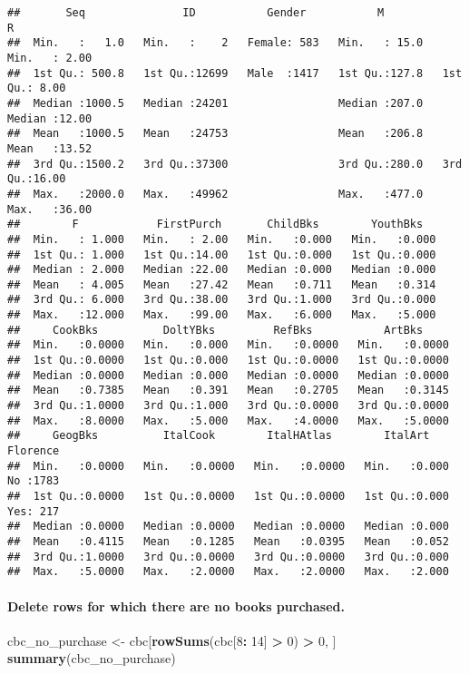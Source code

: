 \documentclass[
]{article}
\newenvironment{Shaded}{\begin{snugshade}}{\end{snugshade}}
\newcommand{\DecValTok}[1]{\textcolor[rgb]{0.00,0.00,0.81}{#1}}
\newcommand{\FunctionTok}[1]{\textcolor[rgb]{0.13,0.29,0.53}{\textbf{#1}}}
\newcommand{\NormalTok}[1]{#1}
\newcommand{\OtherTok}[1]{\textcolor[rgb]{0.56,0.35,0.01}{#1}}
\newcommand{\SpecialCharTok}[1]{\textcolor[rgb]{0.81,0.36,0.00}{\textbf{#1}}}
\begin{document}
\begin{verbatim}
##       Seq               ID           Gender           M               R        
##  Min.   :   1.0   Min.   :    2   Female: 583   Min.   : 15.0   Min.   : 2.00  
##  1st Qu.: 500.8   1st Qu.:12699   Male  :1417   1st Qu.:127.8   1st Qu.: 8.00  
##  Median :1000.5   Median :24201                 Median :207.0   Median :12.00  
##  Mean   :1000.5   Mean   :24753                 Mean   :206.8   Mean   :13.52  
##  3rd Qu.:1500.2   3rd Qu.:37300                 3rd Qu.:280.0   3rd Qu.:16.00  
##  Max.   :2000.0   Max.   :49962                 Max.   :477.0   Max.   :36.00  
##        F            FirstPurch       ChildBks        YouthBks    
##  Min.   : 1.000   Min.   : 2.00   Min.   :0.000   Min.   :0.000  
##  1st Qu.: 1.000   1st Qu.:14.00   1st Qu.:0.000   1st Qu.:0.000  
##  Median : 2.000   Median :22.00   Median :0.000   Median :0.000  
##  Mean   : 4.005   Mean   :27.42   Mean   :0.711   Mean   :0.314  
##  3rd Qu.: 6.000   3rd Qu.:38.00   3rd Qu.:1.000   3rd Qu.:0.000  
##  Max.   :12.000   Max.   :99.00   Max.   :6.000   Max.   :5.000  
##     CookBks          DoltYBks         RefBks           ArtBks      
##  Min.   :0.0000   Min.   :0.000   Min.   :0.0000   Min.   :0.0000  
##  1st Qu.:0.0000   1st Qu.:0.000   1st Qu.:0.0000   1st Qu.:0.0000  
##  Median :0.0000   Median :0.000   Median :0.0000   Median :0.0000  
##  Mean   :0.7385   Mean   :0.391   Mean   :0.2705   Mean   :0.3145  
##  3rd Qu.:1.0000   3rd Qu.:1.000   3rd Qu.:0.0000   3rd Qu.:0.0000  
##  Max.   :8.0000   Max.   :5.000   Max.   :4.0000   Max.   :5.0000  
##     GeogBks          ItalCook        ItalHAtlas        ItalArt      Florence  
##  Min.   :0.0000   Min.   :0.0000   Min.   :0.0000   Min.   :0.000   No :1783  
##  1st Qu.:0.0000   1st Qu.:0.0000   1st Qu.:0.0000   1st Qu.:0.000   Yes: 217  
##  Median :0.0000   Median :0.0000   Median :0.0000   Median :0.000             
##  Mean   :0.4115   Mean   :0.1285   Mean   :0.0395   Mean   :0.052             
##  3rd Qu.:1.0000   3rd Qu.:0.0000   3rd Qu.:0.0000   3rd Qu.:0.000             
##  Max.   :5.0000   Max.   :2.0000   Max.   :2.0000   Max.   :2.000
\end{verbatim}

\paragraph{Delete rows for which there are no books
purchased.}\label{delete-rows-for-which-there-are-no-books-purchased.}

\begin{Shaded}
\begin{Highlighting}[]
\NormalTok{cbc\_no\_purchase }\OtherTok{\textless{}{-}}\NormalTok{ cbc[}\FunctionTok{rowSums}\NormalTok{(cbc[}\DecValTok{8}\SpecialCharTok{:} \DecValTok{14}\NormalTok{] }\SpecialCharTok{\textgreater{}} \DecValTok{0}\NormalTok{) }\SpecialCharTok{\textgreater{}} \DecValTok{0}\NormalTok{, ]}
\FunctionTok{summary}\NormalTok{(cbc\_no\_purchase)}
\end{Highlighting}
\end{Shaded}
\end{document}
